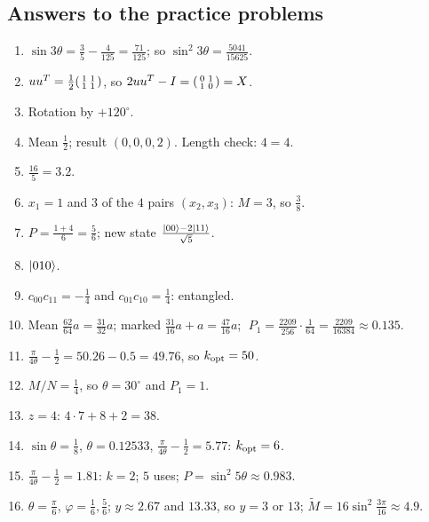 \documentclass[11pt,a4paper,openany]{book}
\newcommand{\kopt}{k_{\rm opt}}
\begin{document}
\subsection*{Answers to the practice problems}
\begin{enumerate}[label=\textbf{P\arabic*.}, leftmargin=2.6em, itemsep=3pt]
\item $\sin3\theta = \frac35 - \frac{4}{125} = \frac{71}{125}$; so $\sin^2 3\theta = \frac{5041}{15625}$.
\item $uu^{T} = \frac12\begin{psmallmatrix}1&1\\1&1\end{psmallmatrix}$, so $2uu^{T} - I = \begin{psmallmatrix}0&1\\1&0\end{psmallmatrix} = X$.
\item Rotation by $+120^\circ$.
\item Mean $\frac12$; result $(0, 0, 0, 2)$. Length check: $4 = 4$.
\item $\frac{16}{5} = 3.2$.
\item $x_1 = 1$ and $3$ of the $4$ pairs $(x_2, x_3)$: $M = 3$, so $\frac38$.
\item $P = \frac{1 + 4}{6} = \frac56$; new state $\frac{\ket{00} - 2\ket{11}}{\sqrt5}$.
\item $\ket{010}$.
\item $c_{00}c_{11} = -\frac14$ and $c_{01}c_{10} = \frac14$: entangled.
\item Mean $\frac{62}{64}a = \frac{31}{32}a$; marked $\frac{31}{16}a + a = \frac{47}{16}a$; $\;P_1 = \frac{2209}{256}\cdot\frac{1}{64} = \frac{2209}{16384} \approx 0.135$.
\item $\frac{\pi}{4\theta} - \frac12 = 50.26 - 0.5 = 49.76$, so $\kopt = 50$.
\item $M/N = \frac14$, so $\theta = 30^\circ$ and $P_1 = 1$.
\item $z = 4$: $4\cdot7 + 8 + 2 = 38$.
\item $\sin\theta = \frac18$, $\theta = 0.12533$, $\frac{\pi}{4\theta} - \frac12 = 5.77$: $\kopt = 6$.
\item $\frac{\pi}{4\theta} - \frac12 = 1.81$: $k = 2$; $5$ uses; $P = \sin^2 5\theta \approx 0.983$.
\item $\theta = \frac\pi6$, $\varphi = \frac16, \frac56$; $y \approx 2.67$ and $13.33$, so $y = 3$ or $13$; $\tilde M = 16\sin^2\frac{3\pi}{16} \approx 4.9$.
\end{enumerate}
\end{document}

